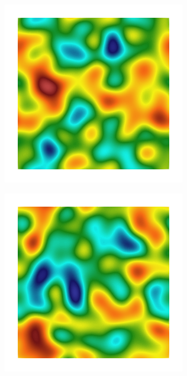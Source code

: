 \begin{figure}[!htb]
    \begin{subfigure}[b]{0.15\textwidth}
        \includegraphics[width=\textwidth]{past/figures/Gc_sqexp_cartesian_10_10_rho_0_seed_a.png}
    \end{subfigure}
    \begin{subfigure}[b]{0.15\textwidth}
        \includegraphics[width=\textwidth]{past/figures/psic_sqexp_cartesian_10_10_rho_0_seed_a.png}

\end{subfigure}
\end{figure}
